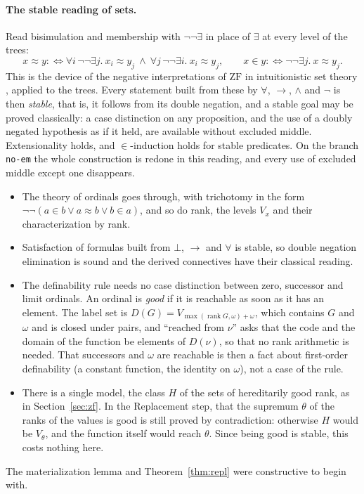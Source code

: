 \documentclass[10pt]{article}
\theoremstyle{definition}
\theoremstyle{remark}
\newcommand{\ZF}{\mathrm{ZF}}
\newcommand{\rk}{\operatorname{rank}}
\newcommand{\lean}[1]{\texttt{#1}}
\begin{document}
\paragraph{The stable reading of sets.}
Read bisimulation and membership with $\neg\neg\exists$ in place of $\exists$ at
every level of the trees:
\[x\approx y:\iff\forall i\,\neg\neg\exists j.\ x_i\approx y_j\ \wedge\ \forall j\,\neg\neg\exists i.\ x_i\approx y_j,
\qquad x\in y:\iff\neg\neg\exists j.\ x\approx y_j.\]
This is the device of the negative interpretations of $\ZF$ in
intuitionistic set theory \cite{friedman73,powell75}, applied to the
trees.
Every statement built from these by $\forall$, $\to$, $\wedge$ and $\neg$ is then
\emph{stable}, that is, it follows from its double negation, and a stable
goal may be proved classically: a case distinction on any proposition,
and the use of a doubly negated hypothesis as if it held, are available
without excluded middle. Extensionality holds, and $\in$-induction holds
for stable predicates. On the branch \lean{no-em} the whole construction
is redone in this reading, and every use of excluded middle except one
disappears.
\begin{itemize}
\item The theory of ordinals goes through, with trichotomy in the form
  $\neg\neg(a\in b\vee a\approx b\vee b\in a)$, and so do rank, the levels $V_x$
  and their characterization by rank.
\item Satisfaction of formulas built from $\bot$, $\to$ and $\forall$ is stable,
  so double negation elimination is sound and the derived connectives
  have their classical reading.
\item The definability rule needs no case distinction between zero,
  successor and limit ordinals. An ordinal is \emph{good} if it is
  reachable as soon as it has an element. The label set is
  $D(G)=V_{\max(\rk G,\omega)+\omega}$, which contains $G$ and $\omega$ and is closed
  under pairs, and ``reached from $\nu$'' asks that the code and the domain
  of the function be elements of $D(\nu)$, so that no rank arithmetic is
  needed. That successors and $\omega$ are reachable is then a fact about
  first-order definability (a constant function, the identity on $\omega$),
  not a case of the rule.
\item There is a single model, the class $H$ of the sets of hereditarily
  good rank, as in Section~\ref{sec:zf}. In the Replacement step, that the
  supremum $\theta$ of the ranks of the values is good is still proved by
  contradiction: otherwise $H$ would be $V_\theta$, and the function itself
  would reach $\theta$. Since being good is stable, this costs nothing here.
\end{itemize}
The materialization lemma and Theorem~\ref{thm:repl} were constructive to
begin with.
\end{document}
